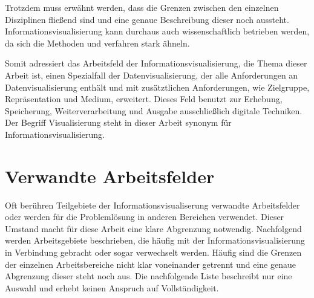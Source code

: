 \documentclass[a4paper, 12pt, DIVcalc, onepage, pdftex, headsepline, footsepline]{scrreprt}
\begin{document}
Trotzdem muss erwähnt werden, dass die Grenzen zwischen den einzelnen Disziplinen fließend sind
und eine genaue Beschreibung dieser noch aussteht. Informationsvisualisierung kann durchaus
auch wissenschaftlich betrieben werden, da sich die Methoden und verfahren stark ähneln.

Somit adressiert das Arbeitsfeld der Informationsvisualisierung, die Thema dieser Arbeit ist,
einen Spezialfall der Datenvisualisierung, der alle Anforderungen an Datenvisualisierung enthält
und mit zusätztlichen Anforderungen, wie Zielgruppe, Repräsentation und Medium, erweitert. Dieses
Feld benutzt zur Erhebung, Speicherung, Weiterverarbeitung und Ausgabe ausschließlich digitale Techniken.
Der Begriff Visualisierung steht in dieser Arbeit synonym für Informationsvisualisierung.

\section{Verwandte Arbeitsfelder}
\label{sec:Arbeitsfelder}
Oft berühren Teilgebiete der Informationsvisualiserung verwandte Arbeitsfelder oder werden für die Problemlösung
in anderen Bereichen verwendet. Dieser Umstand macht für diese Arbeit eine klare Abgrenzung notwendig.
Nachfolgend werden Arbeitsgebiete beschrieben, die häufig mit der Informationsvisualisierung in Verbindung
gebracht oder sogar verwechselt werden. Häufig sind die Grenzen der einzelnen Arbeitsbereiche nicht klar
voneinander getrennt und eine genaue Abgrenzung dieser steht noch aus. Die nachfolgende Liste beschreibt nur
eine Auswahl und erhebt keinen Anspruch auf Vollständigkeit.
\end{document}
